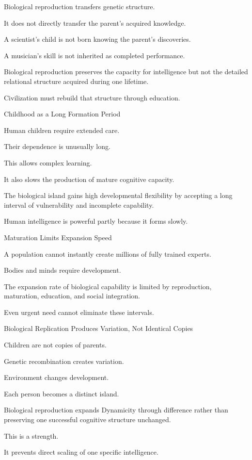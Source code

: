 Biological reproduction transfers genetic structure.

It does not directly transfer the parent’s acquired knowledge.

A scientist’s child is not born knowing the parent’s discoveries.

A musician’s skill is not inherited as completed performance.

Biological reproduction preserves the capacity for intelligence but not the detailed relational structure acquired during one lifetime.

Civilization must rebuild that structure through education.

Childhood as a Long Formation Period

Human children require extended care.

Their dependence is unusually long.

This allows complex learning.

It also slows the production of mature cognitive capacity.

The biological island gains high developmental flexibility by accepting a long interval of vulnerability and incomplete capability.

Human intelligence is powerful partly because it forms slowly.

Maturation Limits Expansion Speed

A population cannot instantly create millions of fully trained experts.

Bodies and minds require development.

The expansion rate of biological capability is limited by reproduction, maturation, education, and social integration.

Even urgent need cannot eliminate these intervals.

Biological Replication Produces Variation, Not Identical Copies

Children are not copies of parents.

Genetic recombination creates variation.

Environment changes development.

Each person becomes a distinct island.

Biological reproduction expands Dynamicity through difference rather than preserving one successful cognitive structure unchanged.

This is a strength.

It prevents direct scaling of one specific intelligence.

